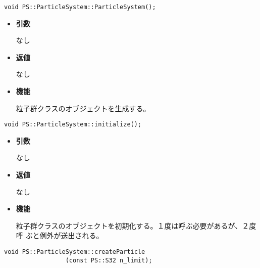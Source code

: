 \begin{screen}
\begin{verbatim}
void PS::ParticleSystem::ParticleSystem();
\end{verbatim}
\end{screen}

\begin{itemize}

\item {\bf 引数}

なし

\item {\bf 返値}

なし

\item {\bf 機能}

粒子群クラスのオブジェクトを生成する。

\end{itemize}


\begin{screen}
\begin{verbatim}
void PS::ParticleSystem::initialize();
\end{verbatim}
\end{screen}

\begin{itemize}

\item {\bf 引数}

なし

\item {\bf 返値}

なし

\item {\bf 機能}

粒子群クラスのオブジェクトを初期化する。１度は呼ぶ必要があるが、２度呼
ぶと例外が送出される。

\end{itemize}


\begin{screen}
\begin{verbatim}
void PS::ParticleSystem::createParticle
                 (const PS::S32 n_limit);
\end{verbatim}
\end{screen}

